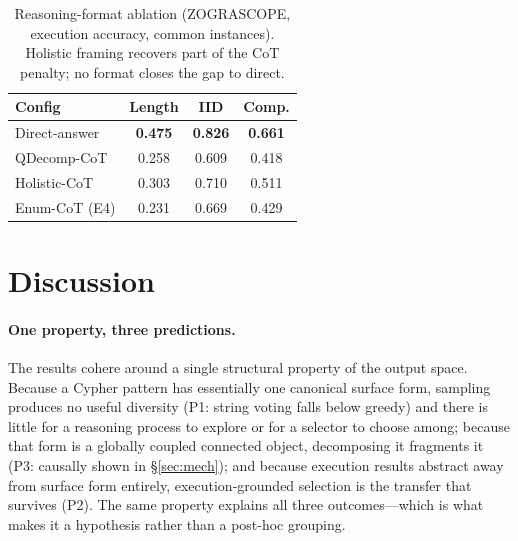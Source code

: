 \documentclass[11pt]{article}
\begin{document}
\begin{table}[t]\centering
\caption{Reasoning-format ablation (ZOGRASCOPE, execution accuracy, common instances). Holistic
framing recovers part of the CoT penalty; no format closes the gap to direct.}
\label{tab:ladder}
\begin{tabular}{lccc}
\toprule
Config & Length & IID & Comp. \\
\midrule
Direct-answer & \textbf{0.475} & \textbf{0.826} & \textbf{0.661} \\
QDecomp-CoT   & 0.258 & 0.609 & 0.418 \\
Holistic-CoT  & 0.303 & 0.710 & 0.511 \\
Enum-CoT (E4) & 0.231 & 0.669 & 0.429 \\
\bottomrule
\end{tabular}
\end{table}

\section{Discussion}
\label{sec:discussion}
\paragraph{One property, three predictions.} The results cohere around a single structural property
of the output space. Because a Cypher pattern has essentially one canonical surface form, sampling
produces no useful diversity (P1: string voting falls below greedy) and there is little for a
reasoning process to explore or for a selector to choose among; because that form is a globally
coupled connected object, decomposing it fragments it (P3: causally shown in \S\ref{sec:mech}); and
because execution results abstract away from surface form entirely, execution-grounded selection is
the transfer that survives (P2). The same property explains all three outcomes---which is what makes
it a hypothesis rather than a post-hoc grouping.
\end{document}
